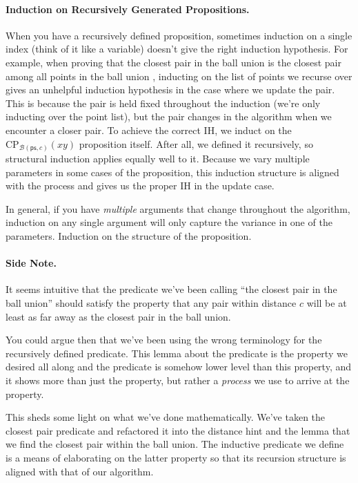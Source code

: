 \documentclass{article}
\begin{document}
\paragraph{Induction on Recursively Generated Propositions.}
When you have a recursively defined proposition, sometimes induction on a single index (think of it like a variable) doesn't give the right induction hypothesis.
For example, when proving that the closest pair in the ball union is the closest pair among all points in the ball union , inducting on the list of points we recurse over gives an unhelpful induction hypothesis in the case where we update the pair.
This is because the pair is held fixed throughout the induction (we're only inducting over the point list), but the pair changes in the algorithm when we encounter a closer pair.
To achieve the correct IH, we induct on the $\text{CP}_{\mathcal{B}(\mathsf{ps}, c)}(xy)$ proposition itself.
After all, we defined it recursively, so structural induction applies equally well to it.
Because we vary multiple parameters in some cases of the proposition, this induction structure is aligned with the process and gives us the proper IH in the update case.

In general, if you have \textit{multiple} arguments that change throughout the algorithm, induction on any single argument will only capture the variance in one of the parameters.
Induction on the structure of the proposition.

\paragraph{Side Note.} It seems intuitive that the predicate we've been calling ``the closest pair in the ball union'' should satisfy the property that any pair within distance $c$ will be at least as far away as the closest pair in the ball union.

You could argue then that we've been using the wrong terminology for the recursively defined predicate.
This lemma about the predicate is the property we desired all along and the predicate is somehow lower level than this property, and it shows more than just the property, but rather a \textit{process} we use to arrive at the property.

This sheds some light on what we've done mathematically.
We've taken the closest pair predicate and refactored it into the distance hint and the lemma that we find the closest pair within the ball union.
The inductive predicate we define is a means of elaborating on the latter property so that its recursion structure is aligned with that of our algorithm.
\end{document}

